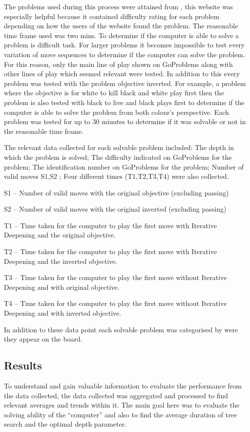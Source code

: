 \documentclass{l4proj}
\begin{document}
The problems used during this process were attained from \cite{GoProblems} , this website was especially helpful because it contained difficulty rating for each problem depending on how the users of the website found the problem. The reasonable time frame used was two mins.
To determine if the computer is able to solve a problem is difficult task. For larger problems it becomes impossible to test every variation of move sequences to determine if the computer can solve the problem. For this reason, only the main line of play shown on GoProblems along with other lines of play which seemed relevant were tested. In addition to this every problem was tested with the problem objective inverted. For example, a problem where the objective is for white to kill black and white play first then the problem is also tested with black to live and black plays first to determine if the computer is able to solve the problem from both colour’s perspective. Each problem was tested for up to 30 minutes to determine if it was solvable or not in the reasonable time frame.

The relevant data collected for each solvable problem included: The depth in which the problem is solved; The difficulty indicated on GoProblems for the problem; The identification number on GoProblems for the problem; Number of valid moves S1,S2 ; Four different times (T1,T2,T3,T4) were also collected.

S1 – Number of valid moves with the original objective (excluding passing)

S2 – Number of valid moves with the original inverted (excluding passing)


T1 – Time taken for the computer to play the first move with Iterative Deepening and the original objective.

T2 – Time taken for the computer to play the first move with Iterative Deepening and the inverted objective.

T3 – Time taken for the computer to play the first move without Iterative Deepening and with original objective.

T4 – Time taken for the computer to play the first move without Iterative Deepening and with inverted objective.

In addition to these data point each solvable problem was categorised by were they appear on the board.

\subsection{Results}
To understand and gain valuable information to evaluate the performance from the data collected, the data collected was aggregated and processed to find relevant averages and trends within it. The main goal here was to evaluate the solving ability of the “computer” and also to find the average duration of tree search and the optimal depth parameter.
\end{document}
